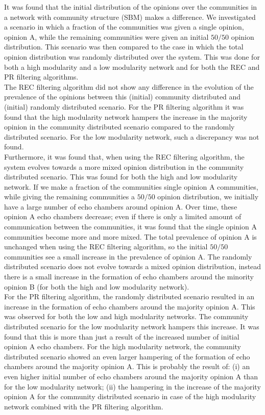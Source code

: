 \documentclass[11 pt , letterpaper , twoside , openright]{book}
\begin{document}
\newline
It was found that the initial distribution of the opinions over the communities in a network with community structure (SBM) makes a difference. We investigated a scenario in which a fraction of the communities was given a single opinion, opinion A, while the remaining communities were given an initial $50/50$ opinion distribution. This scenario was then compared to the case in which the total opinion distribution was randomly distributed over the system. This was done for both a high modularity and a low modularity network and for both the REC and PR filtering algorithms. \\
\newline
The REC filtering algorithm did not show any difference in the evolution of the prevalence of the opinions between this (initial) community distributed and (initial) randomly distributed scenario. For the PR filtering algorithm it was found that the high modularity network hampers the increase in the majority opinion in the community distributed scenario compared to the randomly distributed scenario. For the low modularity network, such a discrepancy was not found.\\
\newline
Furthermore, it was found that, when using the REC filtering algorithm, the system evolves towards a more mixed opinion distribution in the community distributed scenario. This was found for both the high and low modularity network. If we make a fraction of the communities single opinion A communities, while giving the remaining communities a $50/50$ opinion distribution, we initially have a large number of echo chambers around opinion A. Over time, these opinion A echo chambers decrease; even if there is only a limited amount of communication between the communities, it was found that the single opinion A communities become more and more mixed. The total prevalence of opinion A is unchanged when using the REC filtering algorithm, so the initial $50/50$ communities see a small increase in the prevalence of opinion A. The randomly distributed scenario does not evolve towards a mixed opinion distribution, instead there is a small increase in the formation of echo chambers around the minority opinion B (for both the high and low modularity network).\\
\newline
For the PR filtering algorithm, the randomly distributed scenario resulted in an increase in the formation of echo chambers around the majority opinion A. This was observed for both the low and high modularity networks. The community distributed scenario for the low modularity network hampers this increase. It was found that this is more than just a result of the increased number of initial opinion A echo chambers. For the high modularity network, the community distributed scenario showed an even larger hampering of the formation of echo chambers around the majority opinion A. This is probably the result of: (i) an even higher initial number of echo chambers around the majority opinion A than for the low modularity network; (ii) the hampering in the increase of the majority opinion A for the community distributed scenario in case of the high modularity network combined with the PR filtering algorithm. \\
\end{document}
